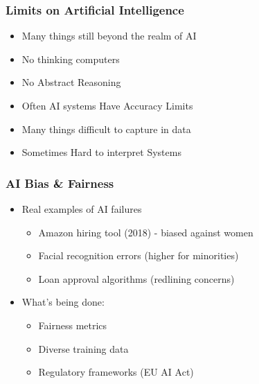 \begin{frame}[fragile]\frametitle{Limits on Artificial Intelligence}
\begin{itemize}
\item  Many things still beyond the realm of AI
\item  No thinking computers
\item  No Abstract Reasoning
\item  Often AI systems Have Accuracy Limits
\item  Many things difficult to capture in data
\item  Sometimes Hard to interpret Systems
\end{itemize}
\end{frame}

\begin{frame}[fragile]\frametitle{AI Bias \& Fairness}
\begin{itemize}
\item Real examples of AI failures
	\begin{itemize}
	\item Amazon hiring tool (2018) - biased against women
	\item Facial recognition errors (higher for minorities)
	\item Loan approval algorithms (redlining concerns)
	\end{itemize}

\item  What's being done:
	\begin{itemize}
	\item Fairness metrics
	\item Diverse training data
	\item Regulatory frameworks (EU AI Act)
	\end{itemize}
	
\end{itemize}
\end{frame}


